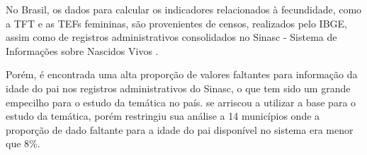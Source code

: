 No Brasil, os dados para calcular os indicadores relacionados à fecundidade, como a TFT e as TEFs femininas, são provenientes de censos, realizados pelo IBGE, assim como de registros administrativos consolidados no Sinasc - Sistema de Informações sobre Nascidos Vivos \cite{rede2002indicadores}.

Porém, é encontrada uma alta proporção de valores faltantes para informação da idade do pai nos registros administrativos do Sinasc, o que tem sido um grande empecilho para o estudo da temática no país.  se arriscou a utilizar a base para o estudo da temática, porém restringiu sua análise a 14 municípios onde a proporção de dado faltante para a idade do pai disponível no sistema era menor que 8\%. 



\begin{comment}
    \textcolor{blue}{colocar os problemas metodológicos, sub registro e métodos (imputação) e a falta de aplicação o Brasil. 
    Os resultados serão muito distintos a depender no método.
    Qual o nível e o padrão da fecundidade masculina no Brasil a partir de diferentes métodos de imputação? 
    
    perguntas secundária; 
     O que dizem os principais estudos sobre a fecundidade masculina no mundo e no Brasil?
     
     Quais os métodos que produzem os melhores resultados para a imputação da idade do pai?---Antes do objetivo, as perguntas de pesquisa.}
        
    
    \textit{\textbf{\textcolor{blue}{Buscar os estudos das preferências masculinas e sua importância para o futuro da fecundidade.}}}

\end{comment}





